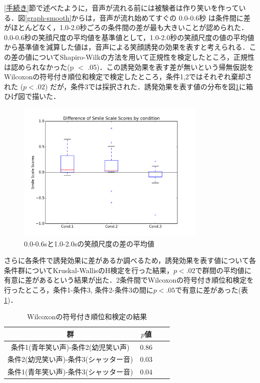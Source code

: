 \documentclass[submit,techreq]{ec2014}
\begin{document}
\ref{手続き}節で述べたように，音声が流れる前には被験者は作り笑いを作っている．図\ref{graph-smooth}からは，音声が流れ始めてすぐの 0.0-0.6秒 は条件間に差がほとんどなく，1.0-2.0秒ごろの条件間の差が最も大きいことが認められた．0.0-0.6秒の笑顔尺度の平均値を基準値として，1.0-2.0秒の笑顔尺度の値の平均値から基準値を減算した値は，音声による笑顔誘発の効果を表すと考えられる．この差の値についてShapiro-Wilkの方法を用いて正規性を検定したところ，正規性は認められなかった(p $<$ .05)．この誘発効果を表す差が無いという帰無仮説をWilcoxonの符号付き順位和検定で検定したところ，条件1,2ではそれぞれ棄却された ($p<.02$) だが，条件3では採択された．誘発効果を表す値の分布を図\ref{graph-diff}に箱ひげ図で描いた．

\begin{figure}[h!]
  \centering
\includegraphics[width=90mm, bb=0 0 600 450]{images/graph-diff.png}
\caption{0.0-0.6sと1.0-2.0sの笑顔尺度の差の平均値}
  \label{graph-diff}
\end{figure}


さらに各条件で誘発効果に差があるか調べるため，誘発効果を表す値について各条件群についてKruskal-WallisのH検定を行った結果，$p<.02$で群間の平均値に有意に差があるという結果が出た．2条件間でWilcoxonの符号付き順位和検定を行ったところ，条件1-条件3, 条件2-条件3の間に$p<.05$で有意に差があった(表\ref{anova-p})．

\break
\begin{table}[htb]
  \begin{center}
    \caption{Wilcoxonの符号付き順位和検定の結果}
    \begin{tabular}{|c|c|r||r|} \hline
      群 & $p$値  \\ \hline  \hline
      条件1(青年笑い声)-条件2(幼児笑い声) & $0.86$ \\ \hline
      条件2(幼児笑い声)-条件3(シャッター音) & $0.03$ \\ \hline
      条件1(青年笑い声)-条件3(シャッター音) & $0.04$ \\ \hline
    \end{tabular}
    \label{anova-p}
  \end{center}
\end{table}
\end{document}

